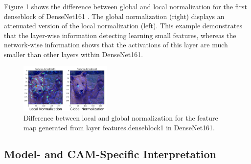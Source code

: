 \documentclass[10pt, conference, compsocconf]{IEEEtran}
\begin{document}

Figure \ref{fig:normalization} shows the difference between global and local normalization for the first denseblock of DenseNet161 \cite{}. The global normalization (right) displays an attenuated version of the local normalization (left). This example demonstrates that the layer-wise information detecting learning small features, whereas the network-wise information shows that the activations of this layer are much smaller than other layers within DenseNet161.


\begin{figure}
    \centering
    \includegraphics[width=0.4\textwidth]{figures/Bear_Normalization.png}
    \caption{Difference between local and global normalization for the feature map generated from layer features.denseblock1 in DenseNet161.}
    \label{fig:normalization}
\end{figure}




\subsection{Model- and CAM-Specific Interpretation}


\end{document}
